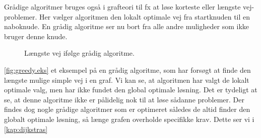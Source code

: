 Grådige algoritmer bruges også i grafteori til fx at løse korteste eller længste vej-problemer. Her vælger algoritmen den lokalt optimale vej fra startknuden til en naboknude. En grådig algoritme ser nu bort fra alle andre muligheder som ikke bruger denne knude.

\begin{figure}[H]
\centering
	\caption{Længste vej ifølge grådig algoritme.}
	\label{fig:greedy.eks}
\end{figure}

\autoref{fig:greedy.eks} et eksempel på en grådig algoritme, som har forsøgt at finde den længste mulige simple vej i en graf. Vi kan se, at algoritmen har valgt de lokalt optimale valg, men har ikke fundet den global optimale løsning. Det er tydeligt at se, at denne algoritme ikke er pålidelig nok til at løse sådanne problemer. Der findes dog nogle grådige algoritmer som er optimeret således de altid finder den globalt optimale løsning, så længe grafen overholde specifikke krav. Dette ser vi i \autoref{kap:dijkstras}

